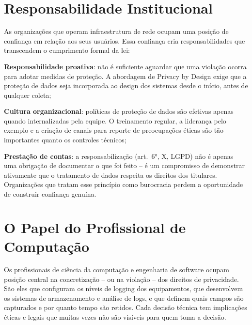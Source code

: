 \section{Responsabilidade Institucional}
\label{sec:responsabilidade-institucional}

As organizações que operam infraestrutura de rede ocupam uma posição de confiança em relação aos seus usuários. Essa confiança cria responsabilidades que transcendem o cumprimento formal da lei:

\begin{alineas}
    \item \textbf{Responsabilidade proativa}: não é suficiente aguardar que uma violação ocorra para adotar medidas de proteção. A abordagem de Privacy by Design exige que a proteção de dados seja incorporada ao design dos sistemas desde o início, antes de qualquer coleta;
    \item \textbf{Cultura organizacional}: políticas de proteção de dados são efetivas apenas quando internalizadas pela equipe. O treinamento regular, a liderança pelo exemplo e a criação de canais para reporte de preocupações éticas são tão importantes quanto os controles técnicos;
    \item \textbf{Prestação de contas}: a responsabilização (art.\ 6°, X, LGPD) não é apenas uma obrigação de documentar o que foi feito -- é um compromisso de demonstrar ativamente que o tratamento de dados respeita os direitos dos titulares. Organizações que tratam esse princípio como burocracia perdem a oportunidade de construir confiança genuína.
\end{alineas}

\section{O Papel do Profissional de Computação}
\label{sec:papel-profissional}

Os profissionais de ciência da computação e engenharia de software ocupam posição central na concretização -- ou na violação -- dos direitos de privacidade. São eles que configuram os níveis de logging dos equipamentos, que desenvolvem os sistemas de armazenamento e análise de logs, e que definem quais campos são capturados e por quanto tempo são retidos. Cada decisão técnica tem implicações éticas e legais que muitas vezes não são visíveis para quem toma a decisão.

